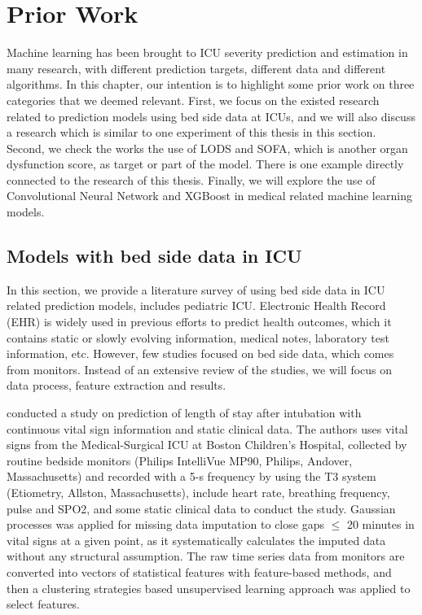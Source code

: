 \documentclass[12pt,a4paper,english
]{tunithesis}
\begin{document}
\chapter{Prior Work}
\label{ch:priorwork}
Machine learning has been brought to ICU severity prediction and estimation in many research, with different prediction targets, different data and different algorithms. In this chapter, our intention is to highlight some prior work on three categories that we deemed relevant. First, we focus on the existed research related to prediction models using bed side data at ICUs, and we will also discuss a research which is similar to one experiment of this thesis in this section. Second, we check the works the use of LODS and SOFA, which is another organ dysfunction score, as target or part of the model. There is one example directly connected to the research of this thesis. Finally, we will explore the use of Convolutional Neural Network and XGBoost in medical related machine learning models. 

\section{Models with bed side data in ICU}
In this section, we provide a literature survey of using bed side data in ICU related prediction models, includes pediatric ICU. Electronic Health Record (EHR) is widely used in previous efforts to predict health outcomes, which it contains static or slowly evolving information, medical notes, laboratory test information, etc. However, few studies focused on bed side data, which comes from monitors. Instead of an extensive review of the studies, we will focus on data process, feature extraction and results.

\textcite{mitdavid2020} conducted a study on prediction of length of stay after intubation with continuous vital sign information and static clinical data. The authors uses vital signs from the Medical-Surgical ICU at Boston Children's Hospital, collected by routine bedside monitors (Philips IntelliVue MP90, Philips, Andover, Massachusetts) and recorded with a 5-s frequency by using the T3 system (Etiometry, Allston, Massachusetts), include heart rate, breathing frequency, pulse and SPO2, and some static clinical data to conduct the study. Gaussian processes was applied for missing data imputation to close gaps $\leq$ 20 minutes in vital signs at a given point, as it systematically calculates the imputed data without any structural assumption. The raw time series data from monitors are converted into vectors of statistical features with feature-based methods, and then a clustering strategies based unsupervised learning approach was applied to select features.
\end{document}
